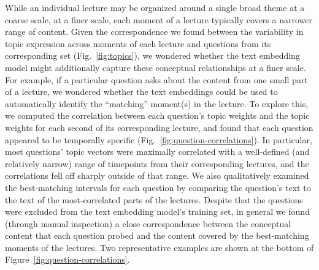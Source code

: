 \documentclass[10pt]{article}
\begin{document}
While an individual lecture may be organized around a single broad theme at a
coarse scale, at a finer scale, each moment of a lecture typically covers a
narrower range of content. Given the correspondence we found between the variability
in topic expression across moments of each lecture and questions from its
corresponding set (Fig.~\ref{fig:topics}), we wondered whether the text embedding model
might additionally capture these conceptual relationships at a finer scale.
For example, if a particular question asks about the content from one small
part of a lecture, we wondered whether the text embeddings could be used to
automatically identify the ``matching'' moment(s) in the lecture. To explore this,
we computed the correlation between each question's topic weights and the topic weights
for each second of its corresponding lecture, and found that each question appeared to be
temporally specific (Fig.~\ref{fig:question-correlations}). In particular, most questions'
topic vectors were maximally correlated with a well-defined (and relatively
narrow) range of timepoints from their corresponding lectures, and the
correlations fell off sharply outside of that range. We also qualitatively examined the
best-matching intervals for each question by comparing the question's text
to the text of the most-correlated parts of the lectures.
Despite that the questions were excluded from the text embedding model's
training set, in general we found (through manual inspection) a close
correspondence between the conceptual content that each question probed and
the content covered by the best-matching moments of the lectures. Two
representative examples are shown at the bottom of
Figure~\ref{fig:question-correlations}.
\end{document}
